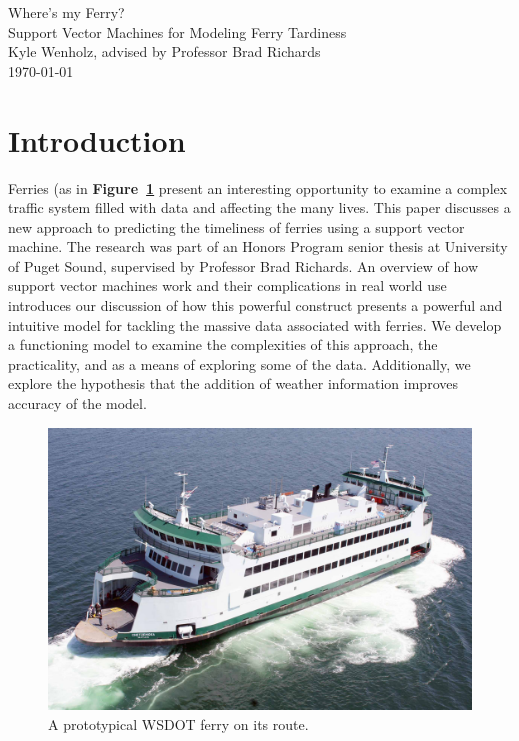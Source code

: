 \documentclass[11pt]{article} %
\begin{document}
\begin{titlepage}
    \vspace*{\fill}
    \begin{center}
      \Huge{Where's my Ferry?}\\[0.5cm]
      \Large{Support Vector Machines for Modeling Ferry Tardiness}\\[0.4cm]
      Kyle Wenholz, advised by Professor Brad Richards\\
      \today
    \end{center}
    \vspace*{\fill}
  \end{titlepage}
\newpage
\vspace*{\fill}
\tableofcontents
\vspace*{\fill}
\newpage


\section{Introduction}
\label{sec:intro}
Ferries (as in \textbf{Figure~\ref{fig:basicferry}} present an interesting 
opportunity to examine a complex traffic system filled with data and affecting 
the many lives. This paper discusses a new approach to predicting 
the timeliness of ferries using a support vector machine. The research was part
of an Honors Program senior thesis at University of Puget Sound, supervised by 
Professor Brad Richards. An overview of how 
support vector machines work and their complications in real world use 
introduces our discussion of how this powerful construct presents a powerful and 
intuitive model for tackling the massive data associated with ferries. We
develop a functioning model to examine the complexities of this
approach, the practicality, and as a means of exploring some of the data. 
Additionally, we explore the hypothesis that the addition of weather information 
improves accuracy of the model.

\begin{figure}[h]
  \centering
  \includegraphics[scale=.15]{images/ferry.jpg}
  \caption{A prototypical WSDOT ferry on its route.}
  \label{fig:basicferry}
\end{figure}
\end{document}
